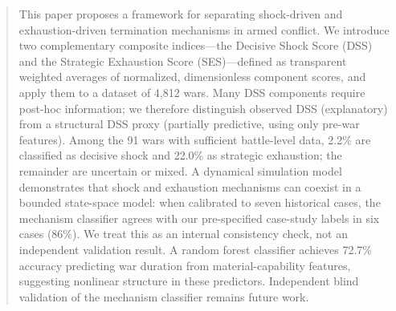 \begin{abstract}
This paper proposes a framework for separating shock-driven and exhaustion-driven termination mechanisms in armed conflict. We introduce two complementary composite indices---the Decisive Shock Score (DSS) and the Strategic Exhaustion Score (SES)---defined as transparent weighted averages of normalized, dimensionless component scores, and apply them to a dataset of 4,812 wars. Many DSS components require post-hoc information; we therefore distinguish observed DSS (explanatory) from a structural DSS proxy (partially predictive, using only pre-war features). Among the 91 wars with sufficient battle-level data, 2.2\% are classified as decisive shock and 22.0\% as strategic exhaustion; the remainder are uncertain or mixed. A dynamical simulation model demonstrates that shock and exhaustion mechanisms can coexist in a bounded state-space model: when calibrated to seven historical cases, the mechanism classifier agrees with our pre-specified case-study labels in six cases (86\%). We treat this as an internal consistency check, not an independent validation result. A random forest classifier achieves 72.7\% accuracy predicting war duration from material-capability features, suggesting nonlinear structure in these predictors. Independent blind validation of the mechanism classifier remains future work.
\end{abstract}
